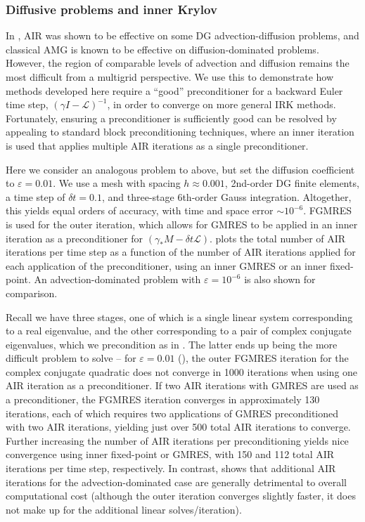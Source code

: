 \documentclass[review]{siamart}
\begin{document}
\subsubsection{Diffusive problems and inner Krylov}\label{sec:numerics:dg:diff}

In \cite{Manteuffel:2019}, AIR was shown to be effective on some DG advection-diffusion
problems, and classical AMG is known to be effective on diffusion-dominated
problems. However, the region of comparable levels of advection and diffusion
remains the most difficult from a multigrid perspective. We use this to
demonstrate how methods developed here require a ``good'' preconditioner
for a backward Euler time step, $(\gamma I - \mathcal{L})^{-1}$,
in order to converge on more general IRK
methods. Fortunately, ensuring a preconditioner is sufficiently good can be
resolved by appealing to standard block preconditioning techniques, where an inner
iteration is used that applies multiple AIR iterations as a single preconditioner.

Here we consider an analogous problem to above, but set the diffusion coefficient
to $\varepsilon = 0.01$. We use a mesh with spacing $h \approx 0.001$, 2nd-order
DG finite elements, a time step of $\delta t = 0.1$, and three-stage 6th-order
Gauss integration. Altogether, this yields equal orders of accuracy, with time and
space error $\sim10^{-6}$. FGMRES \cite{saad1993flexible} is used for the
outer iteration, which allows for GMRES to be applied in an inner iteration
as a preconditioner for $(\gamma_* M - \delta t \mathcal{L})$.  plots the
total number of AIR iterations per time step as a function of the number of
AIR iterations applied for each application of the preconditioner, using an
inner GMRES or an inner fixed-point. An advection-dominated problem
with $\varepsilon = 10^{-6}$ is also shown for comparison.

Recall we have three stages, one of which is a single linear system corresponding
to a real eigenvalue, and the other corresponding to a pair of complex conjugate
eigenvalues, which we precondition as in . The latter ends up being
the more difficult problem to solve -- for $\varepsilon =0.01$ (),
the outer FGMRES iteration for the complex conjugate quadratic does not converge in
1000 iterations when using one AIR iteration as a preconditioner.
If two AIR iterations with GMRES are used as a preconditioner,
the FGMRES iteration converges in approximately 130 iterations, each of which
requires two applications of GMRES preconditioned with two AIR iterations,
yielding just over 500 total AIR iterations to converge. Further increasing
the number of AIR iterations per preconditioning yields nice convergence
using inner fixed-point or GMRES, with 150 and 112 total AIR iterations per
time step, respectively. In contrast,  shows that
additional AIR iterations for the advection-dominated case are generally
detrimental to overall computational cost (although the outer iteration
converges slightly faster, it does not make up for the additional linear
solves/iteration).
\end{document}
